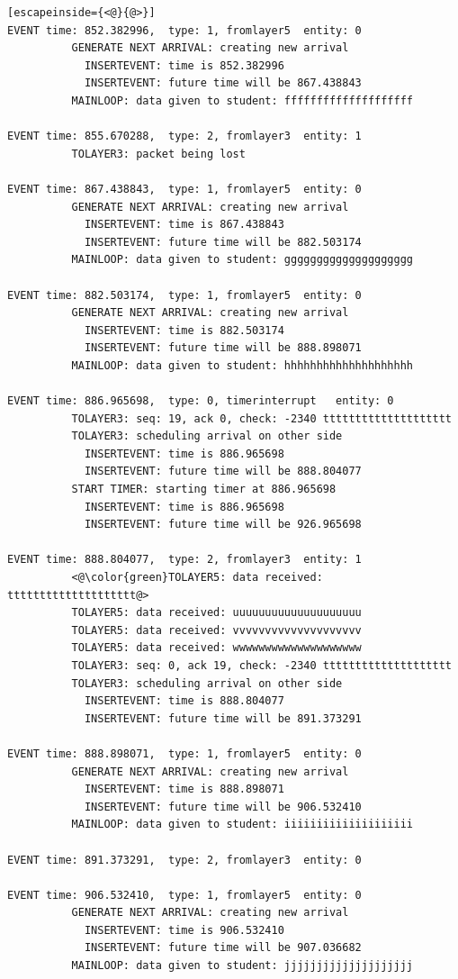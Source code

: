 \documentclass[paper=a4, fontsize=11pt]{scrartcl}
\numberwithin{equation}{section}		%
\numberwithin{figure}{section}			%
\numberwithin{table}{section}				%
\begin{document}
\begin{lstlisting}[escapeinside={<@}{@>}]
EVENT time: 852.382996,  type: 1, fromlayer5  entity: 0
          GENERATE NEXT ARRIVAL: creating new arrival
            INSERTEVENT: time is 852.382996
            INSERTEVENT: future time will be 867.438843
          MAINLOOP: data given to student: ffffffffffffffffffff

EVENT time: 855.670288,  type: 2, fromlayer3  entity: 1
          TOLAYER3: packet being lost

EVENT time: 867.438843,  type: 1, fromlayer5  entity: 0
          GENERATE NEXT ARRIVAL: creating new arrival
            INSERTEVENT: time is 867.438843
            INSERTEVENT: future time will be 882.503174
          MAINLOOP: data given to student: gggggggggggggggggggg

EVENT time: 882.503174,  type: 1, fromlayer5  entity: 0
          GENERATE NEXT ARRIVAL: creating new arrival
            INSERTEVENT: time is 882.503174
            INSERTEVENT: future time will be 888.898071
          MAINLOOP: data given to student: hhhhhhhhhhhhhhhhhhhh

EVENT time: 886.965698,  type: 0, timerinterrupt   entity: 0
          TOLAYER3: seq: 19, ack 0, check: -2340 tttttttttttttttttttt
          TOLAYER3: scheduling arrival on other side
            INSERTEVENT: time is 886.965698
            INSERTEVENT: future time will be 888.804077
          START TIMER: starting timer at 886.965698
            INSERTEVENT: time is 886.965698
            INSERTEVENT: future time will be 926.965698

EVENT time: 888.804077,  type: 2, fromlayer3  entity: 1
          <@\color{green}TOLAYER5: data received: tttttttttttttttttttt@>
          TOLAYER5: data received: uuuuuuuuuuuuuuuuuuuu
          TOLAYER5: data received: vvvvvvvvvvvvvvvvvvvv
          TOLAYER5: data received: wwwwwwwwwwwwwwwwwwww
          TOLAYER3: seq: 0, ack 19, check: -2340 tttttttttttttttttttt
          TOLAYER3: scheduling arrival on other side
            INSERTEVENT: time is 888.804077
            INSERTEVENT: future time will be 891.373291

EVENT time: 888.898071,  type: 1, fromlayer5  entity: 0
          GENERATE NEXT ARRIVAL: creating new arrival
            INSERTEVENT: time is 888.898071
            INSERTEVENT: future time will be 906.532410
          MAINLOOP: data given to student: iiiiiiiiiiiiiiiiiiii

EVENT time: 891.373291,  type: 2, fromlayer3  entity: 0

EVENT time: 906.532410,  type: 1, fromlayer5  entity: 0
          GENERATE NEXT ARRIVAL: creating new arrival
            INSERTEVENT: time is 906.532410
            INSERTEVENT: future time will be 907.036682
          MAINLOOP: data given to student: jjjjjjjjjjjjjjjjjjjj


\end{lstlisting}
\end{document}
